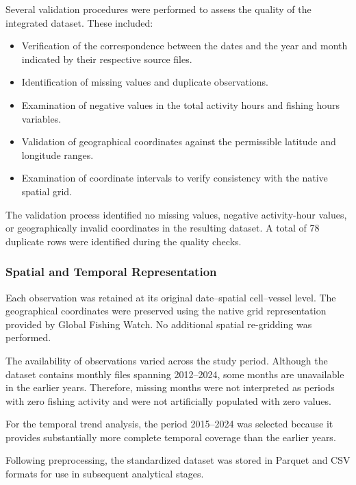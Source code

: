 \documentclass[pdflatex,sn-mathphys-num]{sn-jnl}
\theoremstyle{thmstyleone}
\theoremstyle{thmstyletwo}
\theoremstyle{thmstylethree}
\begin{document}
Several validation procedures were performed to assess
the quality of the integrated dataset. These included:

\begin{itemize}
    \item Verification of the correspondence between
    the dates and the year and month indicated by
    their respective source files.

    \item Identification of missing values and
    duplicate observations.

    \item Examination of negative values in the
    total activity hours and fishing hours variables.

    \item Validation of geographical coordinates
    against the permissible latitude and longitude
    ranges.

    \item Examination of coordinate intervals to
    verify consistency with the native spatial grid.
\end{itemize}

The validation process identified no missing values,
negative activity-hour values, or geographically
invalid coordinates in the resulting dataset. A total
of 78 duplicate rows were identified during the quality
checks.

\subsubsection{Spatial and Temporal Representation}

Each observation was retained at its original
date--spatial cell--vessel level. The geographical
coordinates were preserved using the native grid
representation provided by Global Fishing Watch.
No additional spatial re-gridding was performed.

The availability of observations varied across the
study period. Although the dataset contains monthly
files spanning 2012--2024, some months are unavailable
in the earlier years. Therefore, missing months were
not interpreted as periods with zero fishing activity
and were not artificially populated with zero values.

For the temporal trend analysis, the period
2015--2024 was selected because it provides
substantially more complete temporal coverage than
the earlier years.

Following preprocessing, the standardized dataset
was stored in Parquet and CSV formats for use in
subsequent analytical stages.
\end{document}
